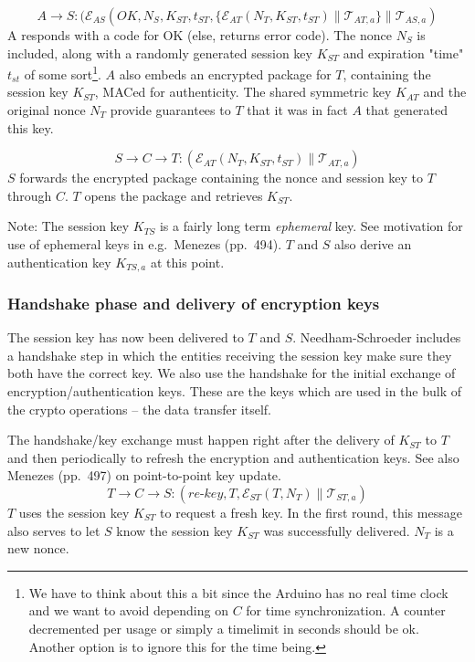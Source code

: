 \[
A \rightarrow S: (\mathcal{E}_{AS}(OK,N_S,K_{ST},t_{ST}, \{ \mathcal{E}_{AT}(N_T,K_{ST},t_{ST}) \parallel \mathcal{T}_{AT,a} \} \parallel \mathcal{T}_{AS,a})
\]
A responds with a code for OK (else, returns error code). The nonce $N_S$ is included, along with a randomly generated session key $K_{ST}$ and expiration "time" $t_{st}$ of some sort\footnote{We have to think about this a bit since the Arduino has no real time clock and we want to avoid depending on $C$ for time synchronization. A counter decremented per usage or simply a timelimit in seconds should be ok. Another option is to ignore this for the time being.}. $A$ also embeds an encrypted package for $T$, containing the session key $K_{ST}$, MACed for authenticity. The shared symmetric key $K_{AT}$ and the original nonce $N_T$ provide guarantees to $T$ that it was in fact $A$ that generated this key.

\[
S \rightarrow C \rightarrow T: (\mathcal{E}_{AT}(N_T,K_{ST},t_{ST}) \parallel \mathcal{T}_{AT,a})
\]
$S$ forwards the encrypted package containing the nonce and session key to $T$ through $C$. $T$ opens the package and retrieves $K_{ST}$. 

Note: The session key $K_{TS}$ is a fairly long term \textit{ephemeral} key. See motivation for use of ephemeral keys in e.g.\ Menezes (pp.\ 494). $T$ and $S$ also derive an authentication key $K_{TS,a}$ at this point.

\subsubsection{Handshake phase and delivery of encryption keys}

The session key has now been delivered to $T$ and $S$. Needham-Schroeder includes a handshake step in which the entities receiving the session key make sure they both have the correct key. We also use the handshake for the initial exchange of encryption/authentication keys. These are the keys which are used in the bulk of the crypto operations -- the data transfer itself.

The handshake/key exchange must happen right after the delivery of $K_{ST}$ to $T$ and then periodically to refresh the encryption and authentication keys. See also Menezes (pp.\ 497) on point-to-point key update.
\[
T \rightarrow C \rightarrow S: (\textit{re-key},T,\mathcal{E}_{ST}(T,N_T) \parallel \mathcal{T}_{ST,a})
\]
$T$ uses the session key $K_{ST}$ to request a fresh key. In the first round, this message also serves to let $S$ know the session key $K_{ST}$ was successfully delivered. $N_T$ is a new nonce.

